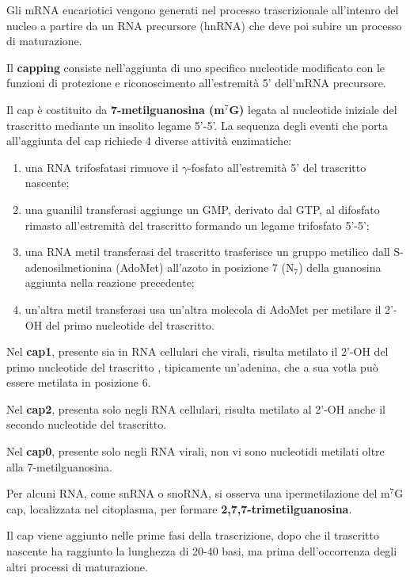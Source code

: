 \documentclass[11pt]{book}
\begin{document}
Gli mRNA eucariotici vengono generati nel processo trascrizionale
all'intenro del nucleo a partire da un RNA precursore (hnRNA) che deve
poi subire un processo di maturazione.

Il \textbf{capping} consiste nell'aggiunta di uno specifico nucleotide
modificato con le funzioni di protezione e riconoscimento all'estremità
5' dell'mRNA precursore.

Il cap è costituito da \textbf{7-metilguanosina (m\(^7\)G)} legata al
nucleotide iniziale del trascritto mediante un insolito legame 5'-5'. La
sequenza degli eventi che porta all'aggiunta del cap richiede 4 diverse
attività enzimatiche:

\begin{enumerate}
\def\labelenumi{\arabic{enumi}.}
\itemsep1pt\parskip0pt
\item
  una RNA trifosfatasi rimuove il \(\gamma\)-fosfato all'estremità 5'
  del trascritto nascente;
\item
  una guanilil transferasi aggiunge un GMP, derivato dal GTP, al
  difosfato rimasto all'estremità del trascritto formando un legame
  trifosfato 5'-5';
\item
  una RNA metil transferasi del trascritto trasferisce un gruppo
  metilico dall S-adenosilmetionina (AdoMet) all'azoto in posizione 7
  (N\(_7\)) della guanosina aggiunta nella reazione precedente;
\item
  un'altra metil transferasi usa un'altra molecola di AdoMet per
  metilare il 2'-OH del primo nucleotide del trascritto.
\end{enumerate}

Nel \textbf{cap1}, presente sia in RNA cellulari che virali, risulta
metilato il 2'-OH del primo nucleotide del trascritto , tipicamente
un'adenina, che a sua votla può essere metilata in posizione 6.

Nel \textbf{cap2}, presenta solo negli RNA cellulari, risulta metilato
al 2'-OH anche il secondo nucleotide del trascritto.

Nel \textbf{cap0}, presente solo negli RNA virali, non vi sono
nucleotidi metilati oltre alla 7-metilguanosina.

Per alcuni RNA, come snRNA o snoRNA, si osserva una ipermetilazione del
m\(^7\)G cap, localizzata nel citoplasma, per formare
\textbf{2,7,7-trimetilguanosina}.

Il cap viene aggiunto nelle prime fasi della trascrizione, dopo che il
trascritto nascente ha raggiunto la lunghezza di 20-40 basi, ma prima
dell'occorrenza degli altri processi di maturazione.
\end{document}
